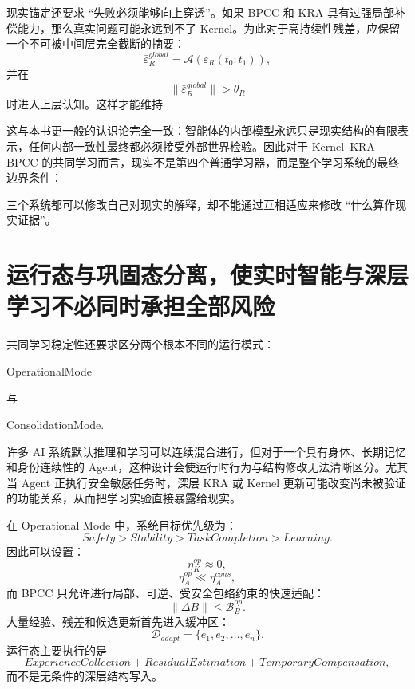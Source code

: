现实锚定还要求 ``失败必须能够向上穿透''。如果 BPCC 和 KRA 具有过强局部补偿能力，那么真实问题可能永远到不了 Kernel。为此对于高持续性残差，应保留一个不可被中间层完全截断的摘要：
\[
\bar\varepsilon_R^{global}
=
\mathcal A
\left(
\varepsilon_R(t_0:t_1)
\right),
\]
并在
\[
\|\bar\varepsilon_R^{global}\|>\theta_R
\]
时进入上层认知。这样才能维持
\begin{statementbox}
\centering
{}
\end{statementbox}

这与本书更一般的认识论完全一致：智能体的内部模型永远只是现实结构的有限表示，任何内部一致性最终都必须接受外部世界检验。因此对于 Kernel--KRA--BPCC 的共同学习而言，现实不是第四个普通学习器，而是整个学习系统的最终边界条件：
\begin{statementbox}
\centering
{}
\end{statementbox}
三个系统都可以修改自己对现实的解释，却不能通过互相适应来修改 ``什么算作现实证据''。

\section{运行态与巩固态分离，使实时智能与深层学习不必同时承担全部风险}

共同学习稳定性还要求区分两个根本不同的运行模式：
\begin{statementbox}
OperationalMode
\end{statementbox}
与
\begin{statementbox}
ConsolidationMode.
\end{statementbox}
许多 AI 系统默认推理和学习可以连续混合进行，但对于一个具有身体、长期记忆和身份连续性的 Agent，这种设计会使运行时行为与结构修改无法清晰区分。尤其当 Agent 正执行安全敏感任务时，深层 KRA 或 Kernel 更新可能改变尚未被验证的功能关系，从而把学习实验直接暴露给现实。

在 Operational Mode 中，系统目标优先级为：
\[
Safety
>
Stability
>
TaskCompletion
>
Learning.
\]
因此可以设置：
\[
\eta_K^{op}\approx0,
\]
\[
\eta_A^{op}\ll\eta_A^{cons},
\]
而 BPCC 只允许进行局部、可逆、受安全包络约束的快速适配：
\[
\|\Delta B\|
\leq
\mathcal B_B^{op}.
\]
大量经验、残差和候选更新首先进入缓冲区：
\[
\mathcal D_{adapt}
=
\{e_1,e_2,\ldots,e_n\}.
\]
运行态主要执行的是
\[
ExperienceCollection
+
ResidualEstimation
+
TemporaryCompensation,
\]
而不是无条件的深层结构写入。

